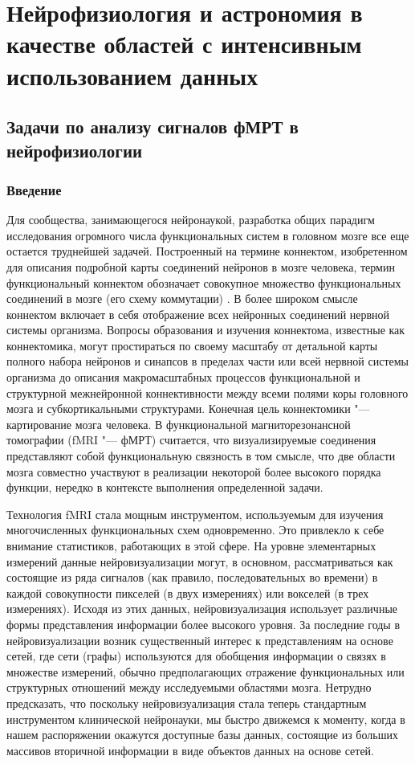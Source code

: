 \chapter{Нейрофизиология и астрономия в качестве областей с интенсивным использованием данных} \label{chapt3}

\section{Задачи по анализу сигналов фМРТ в нейрофизиологии}\label{sect_4_1}
\subsection{Введение}
Для сообщества, занимающегося нейронаукой, разработка общих парадигм исследования огромного числа функциональных систем в головном мозге все еще остается труднейшей задачей. Построенный на термине коннектом, изобретенном для описания подробной карты соединений нейронов в мозге человека, термин функциональный коннектом обозначает совокупное множество функциональных соединений в мозге (его схему коммутации) \cite{biswal2010toward}. В более широком смысле коннектом включает в себя отображение всех нейронных соединений нервной системы организма. Вопросы образования и изучения коннектома, известные как коннектомика, могут простираться по своему масштабу от детальной карты полного набора нейронов и синапсов в пределах части или всей нервной системы организма до описания макромасштабных процессов \cite{craddock2013imaging} функциональной и структурной межнейронной коннективности между всеми полями коры головного мозга и субкортикальными структурами. Конечная цель коннектомики "--- картирование мозга человека. В функциональной магниторезонансной томографии (fMRI "--- фМРТ) считается, что визуализируемые соединения представляют собой функциональную связность в том смысле, что две области мозга совместно участвуют в реализации некоторой более высокого порядка функции, нередко в контексте выполнения определенной задачи. 

Технология fMRI стала мощным инструментом, используемым для изучения многочисленных функциональных схем одновременно. Это привлекло к себе внимание статистиков, работающих в этой сфере. На уровне элементарных измерений данные нейровизуализации могут, в основном, рассматриваться как состоящие из ряда сигналов (как правило, последовательных во времени) в каждой совокупности пикселей (в двух измерениях) или вокселей (в трех измерениях). Исходя из этих данных, нейровизуализация использует различные формы представления информации более высокого уровня. За последние годы в нейровизуализации возник существенный интерес к представлениям на основе сетей, где сети (графы) используются для обобщения информации о связях в множестве измерений, обычно предполагающих отражение функциональных или структурных отношений между исследуемыми областями мозга. Нетрудно предсказать, что поскольку нейровизуализация стала теперь стандартным инструментом клинической нейронауки, мы быстро движемся к моменту, когда в нашем распоряжении окажутся доступные базы данных, состоящие из больших массивов вторичной информации в виде объектов данных на основе сетей. 

